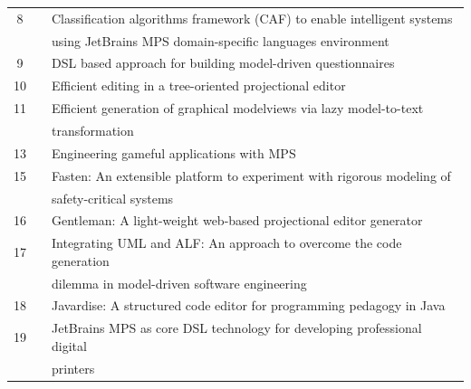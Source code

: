 \begin{table}[htbp]
\begin{center}
\begin{tabular}{ |c  c|l | }
            8   & \cite{meacham2020classification_SLR}   & Classification algorithms framework (CAF) to enable intelligent systems     \\
                &                                        & using JetBrains MPS domain-specific languages environment                   \\ \hline
            9   & \cite{furtado2021dsl_SLR}              & DSL based approach for building model-driven questionnaires                 \\ \hline
            10  & \cite{beckmann2020efficient_SLR}       & Efficient editing in a tree-oriented projectional editor                    \\ \hline
            11  & \cite{kolovos2020efficient_SLR}        & Efficient generation of graphical modelviews via lazy model-to-text         \\
                &                                        & transformation                                                              \\ \hline
            13  & \cite{bucchiarone2021engineering_SLR}  & Engineering gameful applications with MPS                                   \\ \hline
            15  & \cite{ratiu2021fasten_SLR}             & Fasten: An extensible platform to experiment with rigorous modeling of      \\
                &                                        & safety-critical systems                                                     \\ \hline
            16  & \cite{lafontant2020gentleman_SLR}      & Gentleman: A light-weight web-based projectional editor generator           \\ \hline
            17  & \cite{schropfer2019integrating_SLR}    & Integrating UML and ALF: An approach to overcome the code generation        \\
                &                                        & dilemma in model-driven software engineering                                \\ \hline
            18  & \cite{santos2020javardise_SLR}         & Javardise: A structured code editor for programming pedagogy in Java        \\ \hline
            19  & \cite{schindler2021jetbrains_SLR}      & JetBrains MPS as core DSL technology for developing professional digital    \\
                &                                        & printers                                                                    \\ \hline

\end{tabular}
\end{center}
\end{table}
